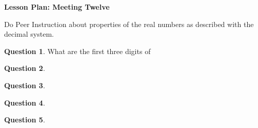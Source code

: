 \documentclass[12pt]{amsart}
\theoremstyle{definition}
\newtheorem{question}{Question}
\begin{document}
\begin{center}
\textbf{\Huge
Lesson Plan: Meeting Twelve
}
\end{center}
\vspace{.5in}

Do Peer Instruction about properties of the real numbers as described with the decimal system.

\begin{question}
What are the first three digits of 
\end{question}

\begin{question}

\end{question}

\begin{question}

\end{question}

\begin{question}

\end{question}

\begin{question}

\end{question}
\end{document}
